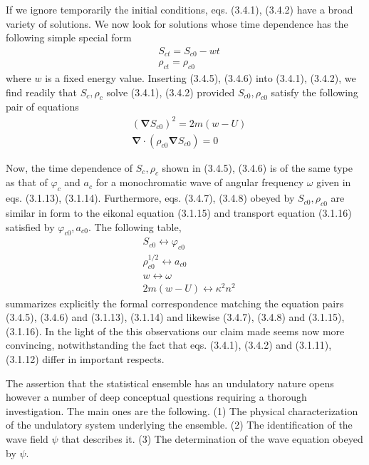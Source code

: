 \documentclass{article}
\begin{document}
If we ignore temporarily the initial conditions, eqs. (3.4.1), (3.4.2) have a broad variety of solutions. We now look for solutions whose time dependence has
the following simple special form
$$
\begin{align*}
& S_{c t}=S_{c 0}-w t  \tag{3.4.5}\\
& \rho_{c t}=\rho_{c 0} \tag{3.4.6}
\end{align*}
$$
where $w$ is a fixed energy value. Inserting (3.4.5), (3.4.6) into (3.4.1), (3.4.2), we find readily that $S_{c}, \rho_{c}$ solve (3.4.1), (3.4.2) provided $S_{c 0}, \rho_{c 0}$ satisfy the following pair of equations
$$
\begin{align*}
& \left(\boldsymbol{\nabla} S_{c 0}\right)^{2}=2 m(w-U)  \tag{3.4.7}\\
& \boldsymbol{\nabla} \cdot\left(\rho_{c 0} \boldsymbol{\nabla} S_{c 0}\right)=0 \tag{3.4.8}
\end{align*}
$$

Now, the time dependence of $S_{c}, \rho_{c}$ shown in (3.4.5), (3.4.6) is of the same type as that of $\varphi_{c}$ and $a_{c}$ for a monochromatic wave of angular frequency $\omega$ given in eqs. (3.1.13), (3.1.14). Furthermore, eqs. (3.4.7), (3.4.8) obeyed by $S_{c 0}, \rho_{c 0}$ are similar in form to the eikonal equation (3.1.15) and transport equation (3.1.16) satisfied by $\varphi_{c 0}, a_{c 0}$. The following table,
$$
\begin{align*}
& S_{c 0} \longleftrightarrow \varphi_{c 0}  \tag{3.4.9}\\
& \rho_{c 0}^{1 / 2} \longleftrightarrow a_{c 0}  \tag{3.4.10}\\
& w \longleftrightarrow \omega  \tag{3.4.11}\\
& 2 m(w-U) \longleftrightarrow \kappa^{2} n^{2} \tag{3.4.12}
\end{align*}
$$
summarizes explicitly the formal correspondence matching the equation pairs (3.4.5), (3.4.6) and (3.1.13), (3.1.14) and likewise (3.4.7), (3.4.8) and (3.1.15), (3.1.16). In the light of the this observations our claim made seems now more convincing, notwithstanding the fact that eqs. (3.4.1), (3.4.2) and (3.1.11), (3.1.12) differ in important respects.

The assertion that the statistical ensemble has an undulatory nature opens however a number of deep conceptual questions requiring a thorough investigation. The main ones are the following.
(1) The physical characterization of the undulatory system underlying the ensemble.
(2) The identification of the wave field $\psi$ that describes it.
(3) The determination of the wave equation obeyed by $\psi$.
\end{document}
